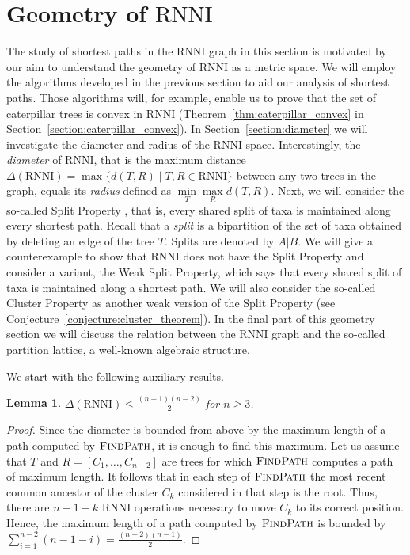 \documentclass{amsart}
\newcommand{\rnni}{\mathrm{RNNI}}
\newcommand{\findpath}{\textsc{FindPath}}
\newtheorem{lemma}[theorem]{Lemma}
\begin{document}
\section{Geometry of $\rnni$}
\label{section:geometry}

The study of shortest paths in the $\rnni$ graph in this section is motivated by our aim to understand the geometry of $\rnni$ as a metric space.
We will employ the algorithms developed in the previous section to aid our analysis of shortest paths.
Those algorithms will, for example, enable us to prove that the set of caterpillar trees is convex in $\rnni$ (Theorem~\ref{thm:caterpillar_convex} in Section~\ref{section:caterpillar_convex}).
In Section~\ref{section:diameter} we will investigate the diameter and radius of the $\rnni$ space.
Interestingly, the \emph{diameter} of $\rnni$, that is the maximum distance $\Delta(\rnni) = \max \{d(T, R) \mid T, R \in \rnni\}$ between any two trees in the graph, equals its \emph{radius} defined as $\min\limits_T \max\limits_R d(T,R)$.
Next, we will consider the so-called Split Property \autocite{Gavryushkin2018-ol}, that is, every shared split of taxa is maintained along every shortest path.
Recall that a \emph{split} is a bipartition of the set of taxa obtained by deleting an edge of the tree $T$.
Splits are denoted by $A|B$.
We will give a counterexample to show that $\rnni$ does not have the Split Property and consider a variant, the Weak Split Property, which says that every shared split of taxa is maintained along a shortest path.
We will also consider the so-called Cluster Property as another weak version of the Split Property (see Conjecture~\ref{conjecture:cluster_theorem}).
In the final part of this geometry section we will discuss the relation between the $\rnni$ graph and the so-called partition lattice, a well-known algebraic structure.

We start with the following auxiliary results.

\begin{lemma}
$\Delta(\rnni) \leq \frac{(n-1)(n-2)}{2}$ for $n \geq 3$.
\label{lemma:diameter_bound}
\end{lemma}

\begin{proof}
Since the diameter is bounded from above by the maximum length of a path computed by $\findpath$, it is enough to find this maximum.
Let us assume that $T$ and $R = [C_1, \ldots, C_{n-2}]$ are trees for which $\findpath$ computes a path of maximum length.
It follows that in each step of $\findpath$ the most recent common ancestor of the cluster $C_k$ considered in that step is the root.
Thus, there are $n-1-k$ $\rnni$ operations necessary to move $C_k$ to its correct position.
Hence, the maximum length of a path computed by $\findpath$ is bounded by $\sum\limits_{i = 1}^{n-2} (n-1-i) = \frac{(n-2)(n-1)}{2}$.
\end{proof}
\end{document}
